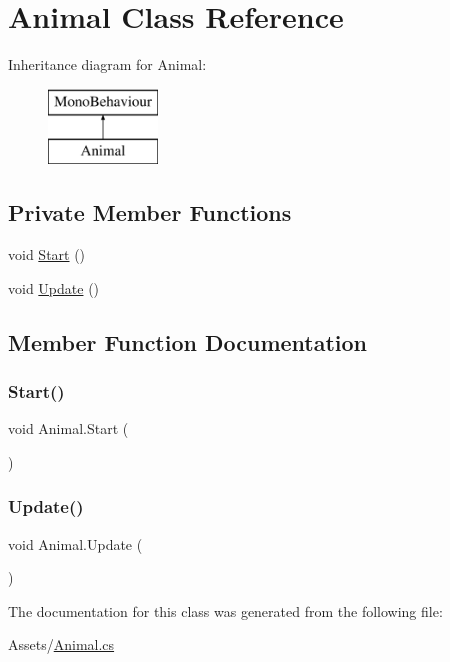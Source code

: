 \hypertarget{class_animal}{}\section{Animal Class Reference}
\label{class_animal}
Inheritance diagram for Animal\+:\begin{figure}[H]
\begin{center}
\leavevmode
\includegraphics[height=2.000000cm]{class_animal}
\end{center}
\end{figure}
\subsection*{Private Member Functions}
\begin{DoxyCompactItemize}
\item 
void \hyperlink{class_animal_a575af2ae0415ed0fece71e6faba71979}{Start} ()
\item 
void \hyperlink{class_animal_a8efd540bef3e9d7776eedae9020ec41c}{Update} ()
\end{DoxyCompactItemize}


\subsection{Member Function Documentation}
\mbox{\label{class_animal_a575af2ae0415ed0fece71e6faba71979}} 
\subsubsection{\texorpdfstring{Start()}{Start()}}
{\footnotesize\ttfamily void Animal.\+Start (\begin{DoxyParamCaption}{ }\end{DoxyParamCaption})\hspace{0.3cm}{\ttfamily [private]}}

\mbox{\label{class_animal_a8efd540bef3e9d7776eedae9020ec41c}} 
\subsubsection{\texorpdfstring{Update()}{Update()}}
{\footnotesize\ttfamily void Animal.\+Update (\begin{DoxyParamCaption}{ }\end{DoxyParamCaption})\hspace{0.3cm}{\ttfamily [private]}}



The documentation for this class was generated from the following file\+:\begin{DoxyCompactItemize}
\item 
Assets/\hyperlink{_animal_8cs}{Animal.\+cs}\end{DoxyCompactItemize}
